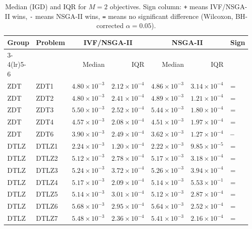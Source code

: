 \begin{table}[t]
\centering
\caption{Median (IGD) and IQR for $M=2$ objectives. Sign column: \texttt{+} means IVF/NSGA-II wins, \texttt{-} means NSGA-II wins, \texttt{=} means no significant difference (Wilcoxon, BH-corrected $\alpha=0.05$).}
\label{tab:igd_m2_ivfnsga-ii}
\scriptsize
\begin{tabular}{llrrrrl}
\toprule
Group & Problem & \multicolumn{2}{c}{IVF/NSGA-II} & \multicolumn{2}{c}{NSGA-II} & Sign \\
\cmidrule(lr){3-4}\cmidrule(lr){5-6}
 & & Median & IQR & Median & IQR & \\
\midrule
ZDT & ZDT1 & $4.80\!\times\!10^{-3}$ & $2.12\!\times\!10^{-4}$ & $4.86\!\times\!10^{-3}$ & $3.14\!\times\!10^{-4}$ & = \\
ZDT & ZDT2 & $4.80\!\times\!10^{-3}$ & $2.41\!\times\!10^{-4}$ & $4.89\!\times\!10^{-3}$ & $1.21\!\times\!10^{-4}$ & = \\
ZDT & ZDT3 & $5.50\!\times\!10^{-3}$ & $2.52\!\times\!10^{-4}$ & $5.44\!\times\!10^{-3}$ & $1.80\!\times\!10^{-4}$ & = \\
ZDT & ZDT4 & $4.57\!\times\!10^{-3}$ & $2.08\!\times\!10^{-4}$ & $4.51\!\times\!10^{-3}$ & $1.97\!\times\!10^{-4}$ & = \\
ZDT & ZDT6 & $3.90\!\times\!10^{-3}$ & $2.49\!\times\!10^{-4}$ & $3.62\!\times\!10^{-3}$ & $1.27\!\times\!10^{-4}$ & \textbf{--} \\
\addlinespace
DTLZ & DTLZ1 & $2.24\!\times\!10^{-3}$ & $1.20\!\times\!10^{-4}$ & $2.22\!\times\!10^{-3}$ & $9.85\!\times\!10^{-5}$ & = \\
DTLZ & DTLZ2 & $5.12\!\times\!10^{-3}$ & $2.78\!\times\!10^{-4}$ & $5.17\!\times\!10^{-3}$ & $3.18\!\times\!10^{-4}$ & = \\
DTLZ & DTLZ3 & $5.24\!\times\!10^{-3}$ & $3.72\!\times\!10^{-4}$ & $5.26\!\times\!10^{-3}$ & $3.94\!\times\!10^{-4}$ & = \\
DTLZ & DTLZ4 & $5.17\!\times\!10^{-3}$ & $2.09\!\times\!10^{-4}$ & $5.14\!\times\!10^{-3}$ & $5.53\!\times\!10^{-1}$ & = \\
DTLZ & DTLZ5 & $5.14\!\times\!10^{-3}$ & $3.01\!\times\!10^{-4}$ & $5.12\!\times\!10^{-3}$ & $2.87\!\times\!10^{-4}$ & = \\
DTLZ & DTLZ6 & $5.68\!\times\!10^{-3}$ & $2.95\!\times\!10^{-4}$ & $5.64\!\times\!10^{-3}$ & $2.52\!\times\!10^{-4}$ & = \\
DTLZ & DTLZ7 & $5.48\!\times\!10^{-3}$ & $2.36\!\times\!10^{-4}$ & $5.41\!\times\!10^{-3}$ & $2.16\!\times\!10^{-4}$ & = \\

\end{tabular}
\end{table}
